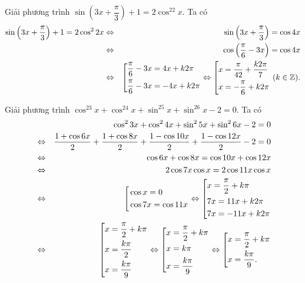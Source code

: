 \begin{bt}%
Giải phương trình $\sin\left(3x+\dfrac{\pi}{3}\right)+1=2\cos^22x$.
\loigiai
{Ta có
\begin{eqnarray*}
\sin\left(3x+\dfrac{\pi}{3}\right)+1=2\cos^22x&\Leftrightarrow&\sin\left(3x+\dfrac{\pi}{3}\right)=\cos4x\\
 &\Leftrightarrow&\cos\left(\dfrac{\pi}{6}-3x\right)=\cos4x\\
 &\Leftrightarrow&\left[\begin{aligned}&\dfrac{\pi}{6}-3x =4x+k2\pi\\&\dfrac{\pi}{6}-3x =-4x+k2\pi\end{aligned}\right.
 \Leftrightarrow\left[\begin{aligned}&x=\dfrac{\pi}{42}+\dfrac{k2\pi}{7}\\&x=-\dfrac{\pi}{6}+k2\pi\end{aligned}\right.\, (k\in\mathbb{Z}).
 \end{eqnarray*}
}
\end{bt}

\begin{bt}%
Giải phương trình $\cos^23x+\cos^24x+\sin^25x+\sin^26x-2=0$.
\loigiai
{Ta có
\begin{eqnarray*}
&& \cos^23x+\cos^24x+\sin^25x+\sin^26x-2=0\\
&\Leftrightarrow&\dfrac{1+\cos6x}{2}+\dfrac{1+\cos8x}{2}+\dfrac{1-\cos10x}{2}+\dfrac{1-\cos12x}{2}-2=0\\
&\Leftrightarrow&\cos6x+\cos8x=\cos10x+\cos12x\\
&\Leftrightarrow&2\cos7x\cos x=2\cos11x\cos x\\
&\Leftrightarrow&\left[\begin{aligned}&\cos x=0\\&\cos7x=\cos11x\end{aligned}\right.
\Leftrightarrow\left[\begin{aligned}&x=\dfrac{\pi}{2}+k\pi\\&7x=11x+k2\pi\\&7x=-11x+k2\pi\end{aligned}\right.\\
&\Leftrightarrow&\left[\begin{aligned}&x=\dfrac{\pi}{2}+k\pi\\&x=\dfrac{k\pi}{2}\\&x=\dfrac{k\pi}{9}\end{aligned}\right.
\Leftrightarrow\left[\begin{aligned}&x=\dfrac{\pi}{2}+k\pi\\&x=k\pi\\&x=\dfrac{k\pi}{9}\end{aligned}\right.\Leftrightarrow\left[\begin{aligned}&x=\dfrac{\pi}{2}+k\pi\\&x=\dfrac{k\pi}{9}.\end{aligned}\right.
 \end{eqnarray*}
}
\end{bt}

